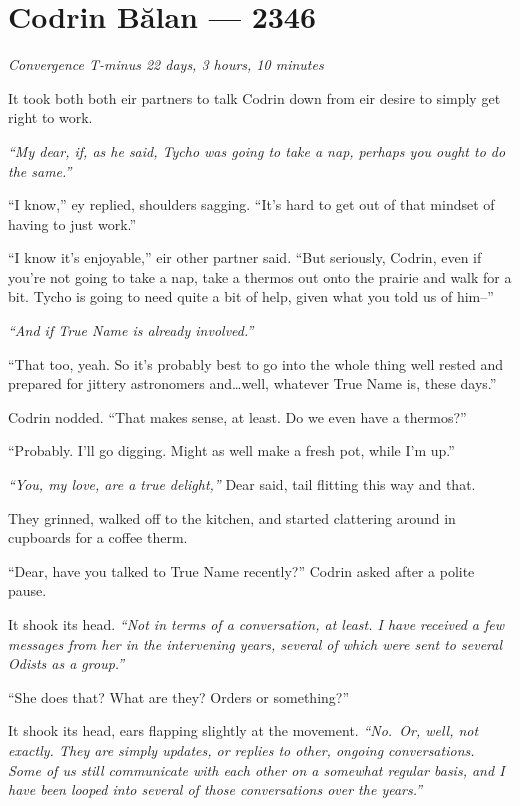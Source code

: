 \hypertarget{codrin-bux103lan-2346}{%
\chapter{Codrin Bălan — 2346}\label{codrin-bux103lan-2346}}

\begin{center}
\emph{Convergence T-minus 22 days, 3 hours, 10 minutes}
\end{center}

\noindent It took both both eir partners to talk Codrin down from eir desire to simply get right to work.

\emph{``My dear, if, as he said, Tycho was going to take a nap, perhaps you ought to do the same.''}

``I know,'' ey replied, shoulders sagging. ``It's hard to get out of that mindset of having to just work.''

``I know it's enjoyable,'' eir other partner said. ``But seriously, Codrin, even if you're not going to take a nap, take a thermos out onto the prairie and walk for a bit. Tycho is going to need quite a bit of help, given what you told us of him--''

\emph{``And if True Name is already involved.''}

``That too, yeah. So it's probably best to go into the whole thing well rested and prepared for jittery astronomers and\ldots well, whatever True Name is, these days.''

Codrin nodded. ``That makes sense, at least. Do we even have a thermos?''

``Probably. I'll go digging. Might as well make a fresh pot, while I'm up.''

\emph{``You, my love, are a true delight,''} Dear said, tail flitting this way and that.

They grinned, walked off to the kitchen, and started clattering around in cupboards for a coffee therm.

``Dear, have you talked to True Name recently?'' Codrin asked after a polite pause.

It shook its head. \emph{``Not in terms of a conversation, at least. I have received a few messages from her in the intervening years, several of which were sent to several Odists as a group.''}

``She does that? What are they? Orders or something?''

It shook its head, ears flapping slightly at the movement. \emph{``No.~Or, well, not exactly. They are simply updates, or replies to other, ongoing conversations. Some of us still communicate with each other on a somewhat regular basis, and I have been looped into several of those conversations over the years.''}

